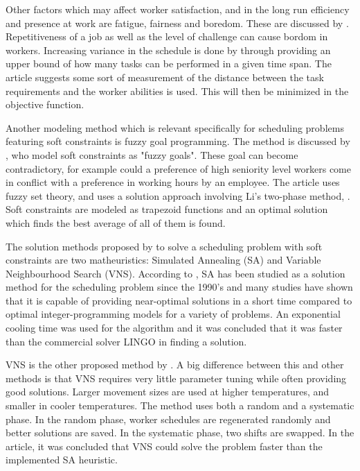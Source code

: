 Other factors which may affect worker satisfaction, and in the long run efficiency and presence at work are fatigue, fairness and boredom. These are discussed by  \citet{eiselt_2008}. Repetitiveness of a job as well as the level of challenge can cause bordom in workers. Increasing variance in the schedule is done by \citet{eiselt_2008} through providing an upper bound of how many tasks can be performed in a given time span. The article suggests some sort of measurement of the distance between the task requirements and the worker abilities is used. This will then be minimized in the objective function.

Another modeling method which is relevant specifically for scheduling problems featuring soft constraints is fuzzy goal programming. The method is discussed by \citet{shahnazari_2013}, who model soft constraints as "fuzzy goals". These goal can become contradictory, for example could a preference of high seniority level workers come in conflict with a preference in working hours by an employee. The article uses fuzzy set theory, and uses a solution approach involving Li's two-phase method, \citet{lee_1989}. Soft constraints are modeled as trapezoid functions and an optimal solution which finds the best average of all of them is found.

The solution methods proposed by \citet{akbari_2013} to solve a scheduling problem with soft constraints are two matheuristics: Simulated Annealing (SA) and Variable Neighbourhood Search (VNS). According to \citet{akbari_2013}, SA has been studied as a solution method for the scheduling problem since the 1990's and many studies have shown that it is capable of providing near-optimal solutions in a short time compared to optimal integer-programming models for a variety of problems. An exponential cooling time was used for the algorithm and it was concluded that it was faster than the commercial solver LINGO in finding a solution.

VNS is the other proposed method by \citet{akbari_2013}. A big difference between this and other methods is that VNS requires very little parameter tuning while often providing good solutions.
Larger movement sizes are used at higher temperatures, and smaller in cooler temperatures. The method uses both a random and a systematic phase. In the random phase, worker schedules are regenerated randomly and better solutions are saved. In the systematic phase, two shifts are swapped. In the article, it was concluded that VNS could solve the problem faster than the implemented SA heuristic.

